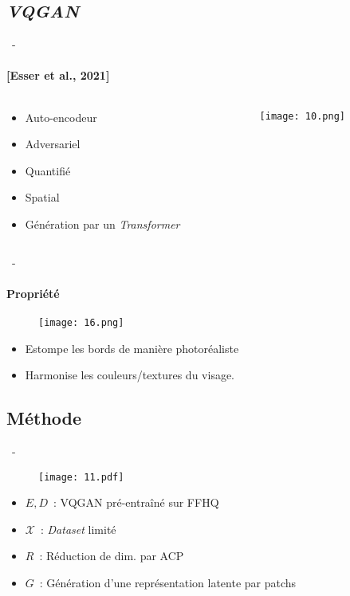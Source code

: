 \documentclass[aspectratio=169, 22pt]{beamer}
\begin{document}
\subsection{\emph{VQGAN}}
\begin{frame}{\secname~- \subsecname}
  \framesubtitle{[Esser et al., 2021]}
  \begin{columns}
    \begin{column}{0.2\linewidth}
      \begin{itemize}
      \item \small Auto-encodeur
      \item \small Adversariel
      \item \small Quantifié
      \item \small Spatial
        \vspace{1em}
      \item \small Génération par un \emph{Transformer}
      \end{itemize}
    \end{column}
    \begin{column}{0.8\linewidth}
      \begin{figure}
        \texttt{[image: 10.png]}
      \end{figure}
    \end{column}
  \end{columns}
\end{frame}

\begin{frame}{\secname~- \subsecname}
  \framesubtitle{Propriété}
  \begin{figure}
    \texttt{[image: 16.png]}
  \end{figure}
  \begin{itemize}
  \item \alert{Estompe les bords} de manière photoréaliste
  \item \alert{Harmonise} les couleurs/textures du visage.
\end{itemize}
\end{frame}


\subsection{Méthode}
\begin{frame}{\secname~- \subsecname}
  \begin{figure}
    \texttt{[image: 11.pdf]}
  \end{figure}
  \begin{itemize}
  \item $E, D$ : VQGAN pré-entraîné sur FFHQ
  \item $\mathcal{X}$ : \emph{Dataset} limité
  \item $R$ : Réduction de dim. par ACP
  \item $G$ : Génération d'une représentation latente par patchs
  \end{itemize}
\end{frame}
\end{document}
